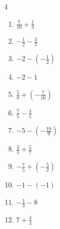 \begin{multicols}{4}
\begin{enumerate}
  \item $\displaystyle \frac{7}{10} + \frac{1}{3}$


\columnbreak %

  \item $\displaystyle -\frac{1}{2} - \frac{3}{2}$

        \phantom{$\displaystyle =-2$}

  \item $\displaystyle -2 - \left(-\frac{1}{2}\right)$


  \item $\displaystyle -2 - 1$

        \phantom{$\displaystyle =-3$}

  \item $\displaystyle \frac{5}{9} + \left(-\frac{7}{10}\right)$


  \item $\displaystyle \frac{7}{5} - \frac{4}{5}$


  \item $\displaystyle -5 - \left(-\frac{10}{9}\right)$


  \item $\displaystyle \frac{3}{5} + \frac{5}{7}$


  \item $\displaystyle -\frac{7}{5} + \left(-\frac{5}{2}\right)$


  \item $\displaystyle -1 - \left(-1\right)$

        \phantom{$\displaystyle =0$}

  \item $\displaystyle -\frac{1}{3} - 8$


\columnbreak %

\resetques

  \item $\displaystyle 7 + \frac{4}{3}$


\end{enumerate}
\end{multicols}
